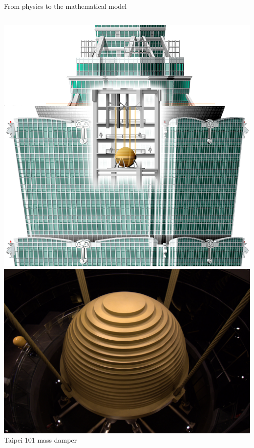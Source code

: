 \begin{frame}{From physics to the mathematical model}
\begin{overprint}
\begin{columns}
      \begin{column}{0.55\textwidth}
      \end{column}
    \end{columns}

    \centering
    \includegraphics[scale=0.15]{section1/pictures/TaipeiTower.png} \quad
    \includegraphics[scale=0.08]{section1/pictures/MassDamper.jpg}\\
    \scriptsize Taipei 101 mass damper


\end{overprint}
\end{frame}
